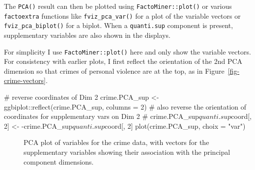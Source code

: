 \documentclass[
  letterpaper,
  10pt,
  krantz2]{krantz}
\makeatletter
\newenvironment{Shaded}{\begin{snugshade}}{\end{snugshade}}
\newcommand{\AttributeTok}[1]{\textcolor[rgb]{0.40,0.45,0.13}{#1}}
\newcommand{\CommentTok}[1]{\textcolor[rgb]{0.37,0.37,0.37}{#1}}
\newcommand{\DecValTok}[1]{\textcolor[rgb]{0.68,0.00,0.00}{#1}}
\newcommand{\FunctionTok}[1]{\textcolor[rgb]{0.28,0.35,0.67}{#1}}
\newcommand{\NormalTok}[1]{\textcolor[rgb]{0.00,0.23,0.31}{#1}}
\newcommand{\OtherTok}[1]{\textcolor[rgb]{0.00,0.23,0.31}{#1}}
\newcommand{\SpecialCharTok}[1]{\textcolor[rgb]{0.37,0.37,0.37}{#1}}
\newcommand{\StringTok}[1]{\textcolor[rgb]{0.13,0.47,0.30}{#1}}
\newenvironment{kframe}{%
  \medskip{}
  \setlength{\fboxsep}{.8em}
  \def\at@end@of@kframe{}%
  \ifinner\ifhmode%
  \def\at@end@of@kframe{\end{minipage}}%
  \begin{minipage}{\columnwidth}%
  \fi\fi%
  \def\FrameCommand##1{\hskip\@totalleftmargin \hskip-\fboxsep
  \colorbox{shadecolor}{##1}\hskip-\fboxsep
      \hskip-\linewidth \hskip-\@totalleftmargin \hskip\columnwidth}%
  \MakeFramed {\advance\hsize-\width
    \@totalleftmargin\z@ \linewidth\hsize
    \@setminipage}}%
{\par\unskip\endMakeFramed%
  \at@end@of@kframe}
\renewenvironment{Shaded}{\begin{kframe}}{\end{kframe}}
\makeatother
\begin{document}
The \texttt{PCA()} result can then be plotted using
\texttt{FactoMiner::plot()} or various \texttt{factoextra} functions
like \texttt{fviz\_pca\_var()} for a plot of the variable vectors or
\texttt{fviz\_pca\_biplot()} for a biplot. When a \texttt{quanti.sup}
component is present, supplementary variables are also shown in the
displays.

For simplicity I use \texttt{FactoMiner::plot()} here and only show the
variable vectors. For consistency with earlier plots, I first reflect
the orientation of the 2nd PCA dimension so that crimes of personal
violence are at the top, as in Figure~\ref{fig-crime-vectors}.

\begin{Shaded}
\begin{Highlighting}[]
\CommentTok{\# reverse coordinates of Dim 2}
\NormalTok{crime.PCA\_sup }\OtherTok{\textless{}{-}}\NormalTok{ ggbiplot}\SpecialCharTok{::}\FunctionTok{reflect}\NormalTok{(crime.PCA\_sup, }\AttributeTok{columns =} \DecValTok{2}\NormalTok{)}
\CommentTok{\# also reverse the orientation of coordinates for supplementary vars on Dim 2}
\CommentTok{\# crime.PCA\_sup$quanti.sup$coord[, 2] \textless{}{-} {-}crime.PCA\_sup$quanti.sup$coord[, 2]}
\FunctionTok{plot}\NormalTok{(crime.PCA\_sup, }\AttributeTok{choix =} \StringTok{"var"}\NormalTok{)}
\end{Highlighting}
\end{Shaded}

\begin{figure}[H]


\caption{\label{fig-crime-factominer}PCA plot of variables for the crime
data, with vectors for the supplementary variables showing their
association with the principal component dimensions.}

\end{figure}%
\end{document}
